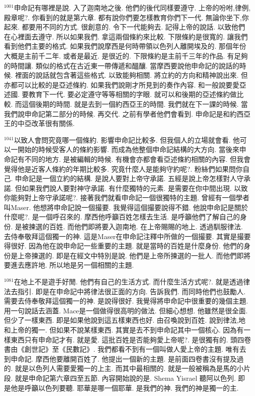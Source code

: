 \documentclass{book}
\begin{document}
$^{1001}$申命記有哪裡是說.
入了迦南地之後.
他們的後代同樣要遵守.
上帝的吩咐,律例,殿章呢?.
你看到的就是第六章.
都有說你們要怎樣教育你們下一代.
無論你坐下,你起來.
都要用不同的方式.
很創意的.
令下一代能夠去.
記得上帝的說話.
以致他們在心裡面去遵守.
所以如果我們.
拿這兩個條約來比較.
下限條約是很寬的.
讓我們看到他們主要的格式.
如果我們說摩西是何時帶領以色列人離開埃及的.
那個年份大概是主前千二年.
或者是最近.
是很近的.
下限條約是主前千三年的作品.
有足夠的時間讓.
類似的格式在古近東一帶傳遞和醞釀.
當摩西要說他申命記的說話的時候.
裡面的說話就包含著這些格式.
以致能夠相關.
將立約的方向和精神說出來.
但亦都可以比較的是亞述條約.
如果我們說剛才所見到的奏作內容.
和一般說要愛亞述國.
要教育下一代.
要必定遵守等等相關的字眼.
就可以和後期的亞述條約做比較.
而這個後期的時間.
就是去到一個約西亞王的時間.
我們就在下一課的時候.
當我們說申命記第二部分的時候.
再交代.
之前有學者他們會看到.
申命記是和約西亞王的中亞改革很有關係.

$^{1041}$以致人會問究竟哪一個條約.
影響申命記比較多.
但我個人的立場就會看.
他可以一開始的時候受客人的條約影響.
而成為他整個申命記結構的大方向.
當後來申命記有不同的地方.
是被編輯的時候.
有機會亦都會看亞述條約相關的內容.
但我會覺得他是近客人條約的年期比較多.
究竟什麼人是能夠守約呢?.
粉絲們如果問你自己.
申命記是一個立約的結構.
是說人要對上帝守承諾.
五經是說上帝怎樣對人守承諾.
但如果我們說人要對神守承諾.
有什麼獨特的元素.
是需要在你中間出現.
以致你能夠對上帝守承諾呢?.
接著我們就看申命記一個很獨特的主題.
曾經有一個學者叫Maser.
他想將申命記說一個撮要.
我覺得這個撮要說得不錯.
他說申命記是關於什麼呢?.
是一個呼召來的.
摩西他呼籲百姓怎樣去生活.
是呼籲他們了解自己的身份.
是被揀選的百姓.
而他們即將要入迦南地.
在上帝賜賜的地上.
透過馴服律法.
去侍奉敬拜這個獨一的神.
這是Maser在申命記注釋中所做的一個撮要.
其實是撮要得很好.
因為他在說申命記一些重要的主題.
就是當時的百姓是什麼身份.
他們的身份是上帝揀選的.
即是在經文中特別是說.
他們是上帝所揀選的一批人.
而他們即將要進去應許地.
所以地是另一個相關的主題.

$^{1081}$在地上不是遊手好閒.
他們有自己的生活方式.
而什麼生活方式呢?.
就是透過律法去指引.
即是在申命記中將律法很正面的方向.
告訴我們.
而同時他們也鼓勵人.
需要去侍奉敬拜這個獨一的神.
是說得很好.
我覺得將申命記中很重要的幾個主題.
用一句說話去涵蓋.
Mace是一個做得很高明的做法.
但細心想想.
他雖然是很全面.
但少了一樣東西.
即是如果他說到這五樣東西也好.
由召喚說到百姓.
說到律法,地和上帝的獨一.
但如果不說某樣東西.
其實是去不到申命記其中一個核心.
因為有一樣東西只有申命記才有.
就是愛.
這批百姓是否能夠愛上帝呢?.
是很獨有的.
頭四卷書由《創世記》至《民數記》.
我們都看不到有一個叫做人愛上帝的主題.
唯有去到申命記.
摩西他要離開百姓了.
他提出一個新的主題.
是前面四卷書沒有提及過的.
就是以色列人需要愛獨一的上主.
而其中最相關的.
就是一般被稱為是馬的小片段.
就是申命記第六章四至五節.
內容開始說的是.
Shema Yisrael 聽阿以色列.
即是他是呼籲以色列要聽.
耶華是哪一個耶華.
是我們的神.
我們的神是獨一的主.
\end{document}
